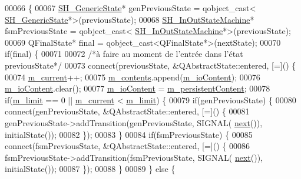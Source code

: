 \begin{DoxyCode}
00066 \{
00067     \hyperlink{classSH__GenericState}{SH\_GenericState}* genPreviousState = qobject\_cast<
      \hyperlink{classSH__GenericState}{SH\_GenericState}*>(previousState);
00068     \hyperlink{classSH__InOutStateMachine}{SH\_InOutStateMachine}* fsmPreviousState = qobject\_cast<
      \hyperlink{classSH__InOutStateMachine}{SH\_InOutStateMachine}*>(previousState);
00069     QFinalState* \textcolor{keyword}{final} = qobject\_cast<QFinalState*>(nextState);
00070     \textcolor{keywordflow}{if}(\textcolor{keyword}{final}) \{
00071 
00072         \textcolor{comment}{/*à faire au moment de l'entrée dans l'état previousState*/}
00073         connect(previousState, &QAbstractState::entered, [=]() \{
00074             \hyperlink{classSH__LoopingInOutStateMachine_af64f9f28a1b8e82bd9ee5f4b96a7c82e}{m\_current}++;
00075             \hyperlink{classSH__LoopingInOutStateMachine_a145e625dcb4d5438bd9c761eeb9425d4}{m\_contents}.append(\hyperlink{classSH__InOutStateMachine_a8cfbc27eef057bf37b7711bdfef2077e}{m\_ioContent});
00076             \hyperlink{classSH__InOutStateMachine_a8cfbc27eef057bf37b7711bdfef2077e}{m\_ioContent}.clear();
00077             \hyperlink{classSH__InOutStateMachine_a8cfbc27eef057bf37b7711bdfef2077e}{m\_ioContent} = \hyperlink{classSH__LoopingInOutStateMachine_a4e9ea23cf1eecbe26c6ed93b290a9115}{m\_persistentContent};
00078             \textcolor{keywordflow}{if}(\hyperlink{classSH__LoopingInOutStateMachine_a818a60d3691fcac11323ad114c309dcb}{m\_limit} == 0 || \hyperlink{classSH__LoopingInOutStateMachine_af64f9f28a1b8e82bd9ee5f4b96a7c82e}{m\_current} < \hyperlink{classSH__LoopingInOutStateMachine_a818a60d3691fcac11323ad114c309dcb}{m\_limit}) \{
00079                 \textcolor{keywordflow}{if}(genPreviousState) \{
00080                     connect(genPreviousState, &QAbstractState::entered, [=]() \{
00081                         genPreviousState->addTransition(genPreviousState, SIGNAL(
      \hyperlink{classSH__GenericStateMachine_af4771d31d87951c997fba1633c2d67f6}{next}()), initialState());
00082                     \});
00083                 \}
00084                 \textcolor{keywordflow}{if}(fsmPreviousState) \{
00085                     connect(fsmPreviousState, &QAbstractState::entered, [=]() \{
00086                         fsmPreviousState->addTransition(fsmPreviousState, SIGNAL(
      \hyperlink{classSH__GenericStateMachine_af4771d31d87951c997fba1633c2d67f6}{next}()), initialState());
00087                     \});
00088                 \}
00089             \} \textcolor{keywordflow}{else} \{

\end{DoxyCode}
